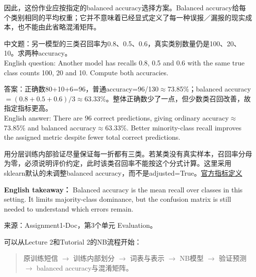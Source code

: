 因此，这份作业应按指定的balanced accuracy选择方案。Balanced accuracy给每个类别相同的平均权重；它并不意味着已经显式定义了每一种误报／漏报的现实成本，也不能由此省略混淆矩阵。





中文题：另一模型的三类召回率为0.8、0.5、0.6，真实类别数量仍是100、20、10。求两种accuracy。\\

English question: Another model has recalls 0.8, 0.5 and 0.6 with the same true class counts 100, 20 and 10. Compute both accuracies.


答案：正确数80+10+6=96，普通accuracy=96/130\ensuremath{\approx}73.85\%；balanced accuracy \(=(0.8+0.5+0.6)/3\approx63.33\%\)。整体正确数少了一点，但少数类召回改善，故指定指标更高。\\

English answer: There are 96 correct predictions, giving ordinary accuracy\ensuremath{\approx}73.85\% and balanced accuracy\ensuremath{\approx}63.33\%. Better minority-class recall improves the assigned metric despite fewer total correct predictions.


用分层训练内部验证尽量保证每一折都有三类。若某类没有真实样本，召回率分母为零，必须说明评价约定，此时该类召回率不能按这个分式计算。这里采用sklearn默认的未调整balanced accuracy，而不是adjusted=True。\href{https://scikit-learn.org/stable/modules/generated/sklearn.metrics.balanced\_accuracy\_score.html}{官方指标定义}


\textbf{English takeaway：} Balanced accuracy is the mean recall over classes in this setting. It limits majority-class dominance, but the confusion matrix is still needed to understand which errors remain.


来源：Assignment1-Doc，第3个单元 Evaluation。








可以从Lecture 2和Tutorial 2的NB流程开始：



\begin{quote}

原训练短信 \ensuremath{\to} 训练内部划分 \ensuremath{\to} 词表与表示 \ensuremath{\to} NB模型 \ensuremath{\to} 验证预测 \ensuremath{\to} balanced accuracy与混淆矩阵。


\end{quote}


